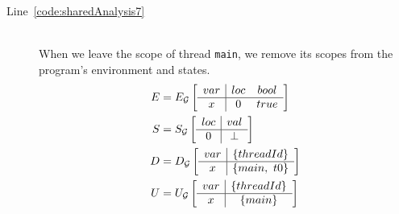 \begin{description}
	\item[Line~\ref{code:sharedAnalysis7}] \hfill \\
		When we leave the scope of thread \verb$main$, we remove its scopes from the
		program's environment and states.
		\begin{align*}
			E &= E_{\mathcal{G}} \left[
				\begin{array}{c | c c}
					var	& loc	& bool	\\ \hline
					x	& 0		& true
				\end{array}
			\right] \\		
			S &= S_{\mathcal{G}} \left[
				\begin{array}{c | c c}
					loc	& val	\\ \hline
					0	& \bot
				\end{array}
			\right] \\
			D &= D_{\mathcal{G}} \left[
				\begin{array}{c | c}
					var	& \lbrace threadId \rbrace	\\ \hline
					x	& \lbrace main,~t0 \rbrace
				\end{array}
			\right] \\
			U &= U_{\mathcal{G}} \left[
				\begin{array}{c | c}
					var	& \lbrace threadId \rbrace	\\ \hline
					x	& \lbrace main \rbrace
				\end{array}
			\right]
		\end{align*}
\end{description}
